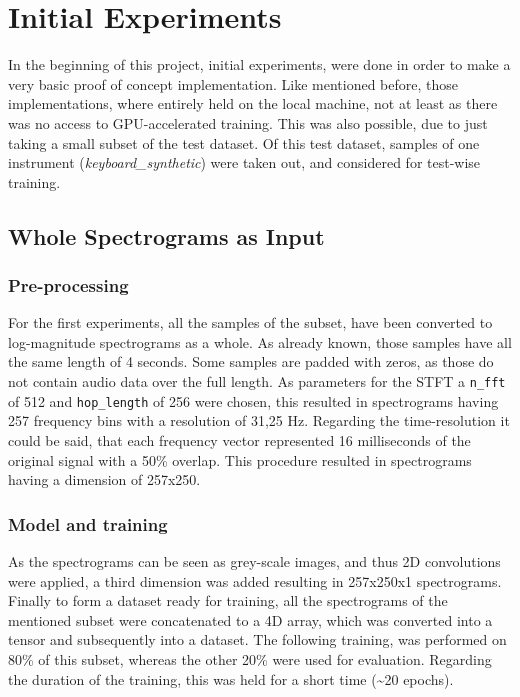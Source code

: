  
\section{Initial Experiments}
\label{sec:exp_init_experiment}
In the beginning of this project, initial experiments, were done in order to make a very basic proof of concept implementation. Like mentioned before, those implementations, where entirely held on the local machine, not at least as there was no access to GPU-accelerated training. This was also possible, due to just taking a small subset of the test dataset. Of this test dataset, samples of one instrument (\textit{keyboard\_synthetic}) were taken out, and considered for test-wise training.

\subsection{Whole Spectrograms as Input}

\subsubsection{Pre-processing}
For the first experiments, all the samples of the subset, have been converted to log-magnitude spectrograms as a whole. As already known, those samples have all the same length of 4 seconds. Some samples are padded with zeros, as those do not contain audio data over the full length. As parameters for the STFT a \texttt{n\_fft} of 512 and \texttt{hop\_length} of 256 were chosen, this resulted in spectrograms having 257 frequency bins with a resolution of 31,25 Hz. Regarding the time-resolution it could be said, that each frequency vector represented 16 milliseconds of the original signal with a 50\% overlap. This procedure resulted in spectrograms having a dimension of 257x250. 

\subsubsection{Model and training}
As the spectrograms can be seen as grey-scale images, and thus 2D convolutions were applied, a third dimension was added resulting in 257x250x1 spectrograms. Finally to form a dataset ready for training, all the spectrograms of the mentioned subset were concatenated to a 4D array, which was converted into a tensor and subsequently into a dataset. The following training, was performed on 80\% of this subset, whereas the other 20\% were used for evaluation. Regarding the duration of the training, this was held for a short time (\textasciitilde20 epochs).


